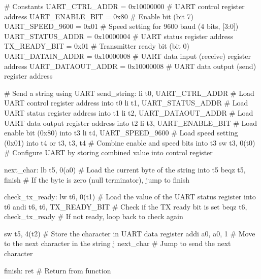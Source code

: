 \begin{assembly}
# Constants
UART_CTRL_ADDR      = 0x10000000  # UART control register address
UART_ENABLE_BIT     = 0x80        # Enable bit (bit 7)
UART_SPEED_9600     = 0x01        # Speed setting for 9600 baud (4 bits, [3:0])
UART_STATUS_ADDR    = 0x10000004  # UART status register address
TX_READY_BIT        = 0x01        # Transmitter ready bit (bit 0)
UART_DATAIN_ADDR    = 0x10000008  # UART data input (receive) register address
UART_DATAOUT_ADDR   = 0x10000008  # UART data output (send) register address

# Send a string using UART
send_string:
    li t0, UART_CTRL_ADDR         # Load UART control register address into t0
    li t1, UART_STATUS_ADDR       # Load UART status register address into t1
    li t2, UART_DATAOUT_ADDR      # Load UART data output register address into t2
    li t3, UART_ENABLE_BIT        # Load enable bit (0x80) into t3
    li t4, UART_SPEED_9600        # Load speed setting (0x01) into t4
    or t3, t3, t4                 # Combine enable and speed bits into t3
    sw t3, 0(t0)                  # Configure UART by storing combined value into control register

next_char:
    lb t5, 0(a0)                  # Load the current byte of the string into t5
    beqz t5, finish               # If the byte is zero (null terminator), jump to finish

check_tx_ready:
    lw t6, 0(t1)                  # Load the value of the UART status register into t6
    andi t6, t6, TX_READY_BIT     # Check if the TX ready bit is set
    beqz t6, check_tx_ready       # If not ready, loop back to check again

    sw t5, 4(t2)                  # Store the character in UART data register
    addi a0, a0, 1                # Move to the next character in the string
    j next_char                   # Jump to send the next character

finish:
    ret                           # Return from function
\end{assembly}

